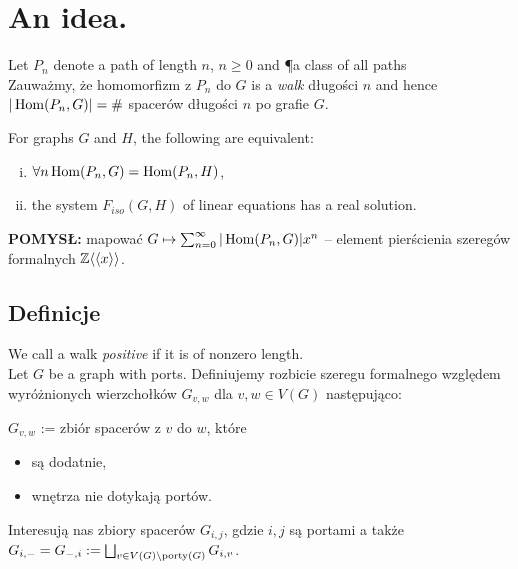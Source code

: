 \section{An idea.}
Let $P_n$ denote a path of length $n$, $n \geq 0$ and \P a class of all paths \\
	Zauważmy, że homomorfizm z $P_n$ do $G$ is a \emph{walk} długości $n$ and hence
	$| \operatorname{Hom}(P_n, G) | = \#$ spacerów długości $n$ po grafie $G$.\\
\begin{tw}
For graphs $G$ and $H$, the following are equivalent: 
\begin{enumerate}[(i)]
	\item $\forall n \operatorname{Hom}(P_n, G) = \operatorname{Hom}(P_n, H)$,
	\item the system $F_{iso}(G,H)$ of linear equations
	has a  real solution.
\end{enumerate}
\end{tw}
\textbf{POMYSŁ: }mapować $G \mapsto \sum_{n = 0} ^ {\infty} |\operatorname{Hom}(P_n, G)| x^n$ -- element pierścienia szeregów formalnych $ \mathbb{ Z } \langle\langle x \rangle\rangle $.
 
\subsection{Definicje}
	We call a walk \emph{positive} if it is of nonzero length.\\
	Let $G$ be a graph with ports. Definiujemy rozbicie szeregu formalnego względem wyróżnionych wierzchołków $G_{v,w}$ dla $v,w \in V(G)$ następująco: 
	
	$G_{v,w}$ :=  zbiór spacerów z $v$ do $w$, które
	\begin{itemize}
		\item są dodatnie,
		\item wnętrza nie dotykają portów.
	\end{itemize}

	Interesują nas zbiory spacerów $G_{i, j}$, gdzie $i, j$ są portami a także $G_{i, -} = G_{-, i} := \bigsqcup_{v \in V(G) \setminus \operatorname{porty}(G)} G_{i, v}$.

